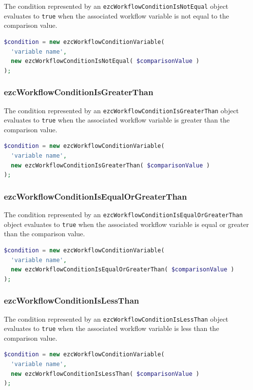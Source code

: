 The condition represented by an \texttt{ezcWorkflowConditionIsNotEqual} object
evaluates to \texttt{true} when the associated workflow variable is not equal
to the comparison value.

\begin{lstlisting}[language=PHP]
$condition = new ezcWorkflowConditionVariable(
  'variable name',
  new ezcWorkflowConditionIsNotEqual( $comparisonValue )
);
\end{lstlisting}

\subsubsection{ezcWorkflowConditionIsGreaterThan}

The condition represented by an \texttt{ezcWorkflowConditionIsGreaterThan}
object evaluates to \texttt{true} when the associated workflow variable is
greater than the comparison value.

\begin{lstlisting}[language=PHP]
$condition = new ezcWorkflowConditionVariable(
  'variable name',
  new ezcWorkflowConditionIsGreaterThan( $comparisonValue )
);
\end{lstlisting}

\subsubsection{ezcWorkflowConditionIsEqualOrGreaterThan}

The condition represented by an \texttt{ezcWorkflowConditionIsEqualOrGreaterThan}
object evaluates to \texttt{true} when the associated workflow variable is
equal or greater than the comparison value.

\begin{lstlisting}[language=PHP]
$condition = new ezcWorkflowConditionVariable(
  'variable name',
  new ezcWorkflowConditionIsEqualOrGreaterThan( $comparisonValue )
);
\end{lstlisting}

\subsubsection{ezcWorkflowConditionIsLessThan}

The condition represented by an \texttt{ezcWorkflowConditionIsLessThan}
object evaluates to \texttt{true} when the associated workflow variable is
less than the comparison value.

\begin{lstlisting}[language=PHP]
$condition = new ezcWorkflowConditionVariable(
  'variable name',
  new ezcWorkflowConditionIsLessThan( $comparisonValue )
);
\end{lstlisting}


